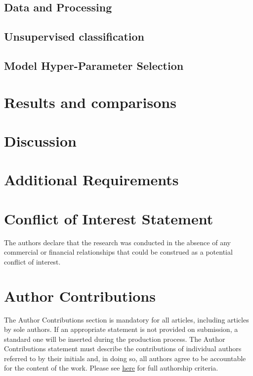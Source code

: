 \documentclass[utf8]{frontiersSCNS} %
\begin{document}
\subsection{Data and Processing}


\subsection{Unsupervised classification}


\subsection{Model Hyper-Parameter Selection}


\section{Results and comparisons}


\section{Discussion}


\section{Additional Requirements}

\section*{Conflict of Interest Statement}

The authors declare that the research was conducted in the absence of any commercial or financial relationships that could be construed as a potential conflict of interest.

\section*{Author Contributions}

The Author Contributions section is mandatory for all articles, including articles by sole authors. If an appropriate statement is not provided on submission, a standard one will be inserted during the production process. The Author Contributions statement must describe the contributions of individual authors referred to by their initials and, in doing so, all authors agree to be accountable for the content of the work. Please see  \href{http://home.frontiersin.org/about/author-guidelines#AuthorandContributors}{here} for full authorship criteria.
\end{document}
